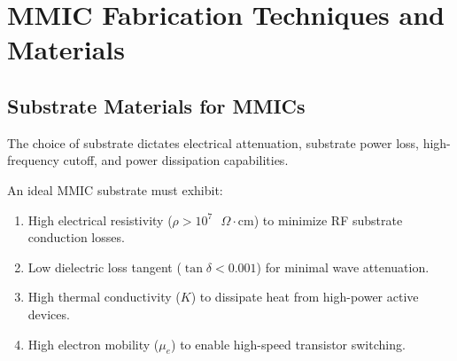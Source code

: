 \documentclass[12pt,a4paper]{article}
\begin{document}
\section{MMIC Fabrication Techniques and Materials}

\subsection{Substrate Materials for MMICs}
The choice of substrate dictates electrical attenuation, substrate power loss, high-frequency cutoff, and power dissipation capabilities.

\begin{tcolorbox}[masonbox, title={Substrate Requirements for MMICs}]
  An ideal MMIC substrate must exhibit:
  \begin{enumerate}[leftmargin=*, noitemsep]
    \item High electrical resistivity ($\rho > 10^7\text{ }\Omega\cdot\text{cm}$) to minimize RF substrate conduction losses.
    \item Low dielectric loss tangent ($\tan\delta < 0.001$) for minimal wave attenuation.
    \item High thermal conductivity ($K$) to dissipate heat from high-power active devices.
    \item High electron mobility ($\mu_e$) to enable high-speed transistor switching.
  \end{enumerate}
\end{tcolorbox}
\end{document}
